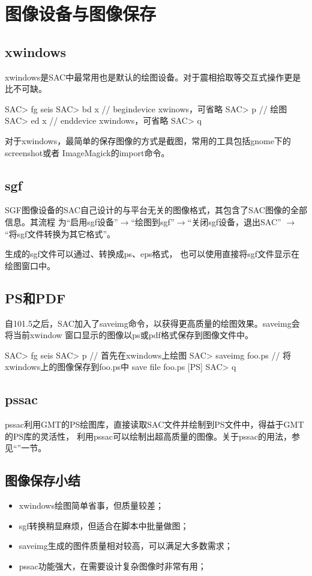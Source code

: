 \section{图像设备与图像保存}
\label{sec:save-image}

\subsection{xwindows}
xwindows是SAC中最常用也是默认的绘图设备。对于震相拾取等交互式操作更是比不可缺。
\begin{SACCode}
SAC> fg seis
SAC> bd x       // begindevice xwinows，可省略
SAC> p          // 绘图
SAC> ed x       // enddevice xwindows，可省略
SAC> q
\end{SACCode}

对于xwindows，最简单的保存图像的方式是截图，常用的工具包括gnome下的screenshot或者
ImageMagick的import命令。

\subsection{sgf}
SGF图像设备的SAC自己设计的与平台无关的图像格式，其包含了SAC图像的全部信息。其流程
为``启用sgf设备''$\rightarrow$``绘图到sgf''$\rightarrow$``关闭sgf设备，退出SAC''
$\rightarrow$``将sgf文件转换为其它格式''。

生成的sgf文件可以通过、转换成ps、eps格式，
也可以使用直接将sgf文件显示在绘图窗口中。

\subsection{PS和PDF}
自101.5之后，SAC加入了saveimg命令，以获得更高质量的绘图效果。saveimg会将当前xwindow
窗口显示的图像以ps或pdf格式保存到图像文件中。

\begin{SACCode}
SAC> fg seis
SAC> p                      // 首先在xwindows上绘图
SAC> saveimg foo.ps         // 将xwindows上的图像保存到foo.ps中
save file foo.ps [PS]
SAC> q
\end{SACCode}

\subsection{pssac}
pssac利用GMT的PS绘图库，直接读取SAC文件并绘制到PS文件中，得益于GMT的PS库的灵活性，
利用pssac可以绘制出超高质量的图像。关于pssac的用法，参见``''一节。

\subsection{图像保存小结}
\begin{itemize}
\item xwindows绘图简单省事，但质量较差；
\item sgf转换稍显麻烦，但适合在脚本中批量做图；
\item saveimg生成的图件质量相对较高，可以满足大多数需求；
\item pssac功能强大，在需要设计复杂图像时非常有用；
\end{itemize}


